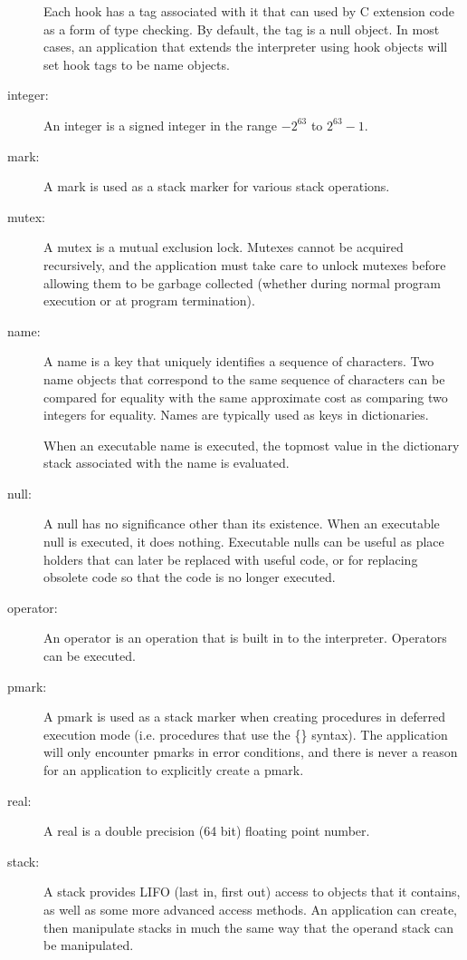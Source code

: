 \begin{description}
Each hook has a tag associated with it that can used by C extension code as a
form of type checking.  By default, the tag is a null object.  In most cases, an
application that extends the interpreter using hook objects will set hook tags
to be name objects.

\item[integer: ] An integer is a signed integer in the range $-2^{63}$ to
$2^{63} - 1$.

\item[mark: ] A mark is used as a stack marker for various stack operations.

\item[mutex: ] A mutex is a mutual exclusion lock.  Mutexes cannot be acquired
recursively, and the application must take care to unlock mutexes before
allowing them to be garbage collected (whether during normal program execution
or at program termination).

\item[name: ] A name is a key that uniquely identifies a sequence of characters.
Two name objects that correspond to the same sequence of characters can be
compared for equality with the same approximate cost as comparing two integers
for equality.  Names are typically used as keys in dictionaries.

When an executable name is executed, the topmost value in the dictionary stack
associated with the name is evaluated.

\item[null: ] A null has no significance other than its existence.  When an
executable null is executed, it does nothing.  Executable nulls can be useful as
place holders that can later be replaced with useful code, or for replacing
obsolete code so that the code is no longer executed.

\item[operator: ] An operator is an operation that is built in to the
interpreter.  Operators can be executed.

\item[pmark: ] A pmark is used as a stack marker when creating procedures in
deferred execution mode (i.e. procedures that use the \{\} syntax).  The
application will only encounter pmarks in error conditions, and there is never a
reason for an application to explicitly create a pmark.

\item[real: ] A real is a double precision (64 bit) floating point number.

\item[stack: ] A stack provides LIFO (last in, first out) access to objects that
it contains, as well as some more advanced access methods.  An application can
create, then manipulate stacks in much the same way that the operand stack can
be manipulated.


\end{description}

